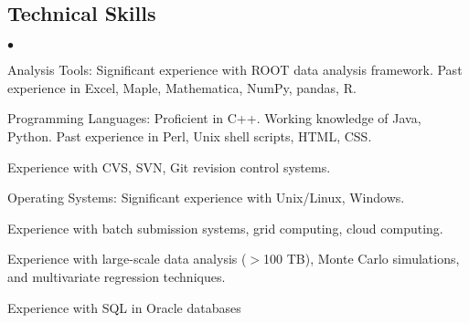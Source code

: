 \documentclass[margin,line]{res}
\newenvironment{list2}{
  \begin{list}{$\bullet$}{%
      \setlength{\itemsep}{0in}
      \setlength{\parsep}{0in} \setlength{\parskip}{0in}
      \setlength{\topsep}{0in} \setlength{\partopsep}{0in} 
      \setlength{\leftmargin}{0.2in}}}{\end{list}}
\begin{document}
\begin{resume}
\section{\sc Technical Skills} 
\begin{list2}
\item Analysis Tools:  Significant experience with ROOT data analysis framework. %
Past experience in Excel, Maple, Mathematica, NumPy, pandas, R.
\item Programming Languages:  Proficient in C++.  Working knowledge of Java, Python.  Past experience in Perl, %
Unix shell scripts, HTML, CSS.
\item Experience with CVS, SVN, Git revision control systems.  
\item Operating Systems:  Significant experience with Unix/Linux, Windows. 
\item Experience with batch submission systems, grid computing, cloud computing.
\item Experience with large-scale data analysis ($>$100 TB), Monte Carlo simulations, %
and multivariate regression techniques. %
\item Experience with SQL in Oracle databases
\end{list2}




\end{resume}
\end{document}
